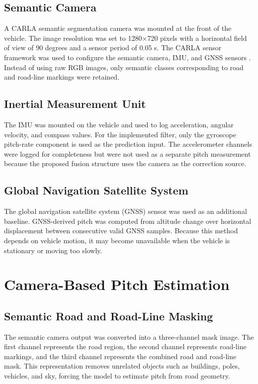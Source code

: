 \documentclass[conference]{IEEEtran}
\begin{document}
\subsection{Semantic Camera}
A CARLA semantic segmentation camera was mounted at the front of the vehicle. The image resolution was set to 1280$\times$720 pixels with a horizontal field of view of 90 degrees and a sensor period of 0.05 s. The CARLA sensor framework was used to configure the semantic camera, IMU, and GNSS sensors \cite{carlaSensors}. Instead of using raw RGB images, only semantic classes corresponding to road and road-line markings were retained.

\subsection{Inertial Measurement Unit}
The IMU was mounted on the vehicle and used to log acceleration, angular velocity, and compass values. For the implemented filter, only the gyroscope pitch-rate component is used as the prediction input. The accelerometer channels were logged for completeness but were not used as a separate pitch measurement because the proposed fusion structure uses the camera as the correction source.

\subsection{Global Navigation Satellite System}
The global navigation satellite system (GNSS) sensor was used as an additional baseline. GNSS-derived pitch was computed from altitude change over horizontal displacement between consecutive valid GNSS samples. Because this method depends on vehicle motion, it may become unavailable when the vehicle is stationary or moving too slowly.

\section{Camera-Based Pitch Estimation}

\subsection{Semantic Road and Road-Line Masking}
The semantic camera output was converted into a three-channel mask image. The first channel represents the road region, the second channel represents road-line markings, and the third channel represents the combined road and road-line mask. This representation removes unrelated objects such as buildings, poles, vehicles, and sky, forcing the model to estimate pitch from road geometry.
\end{document}
